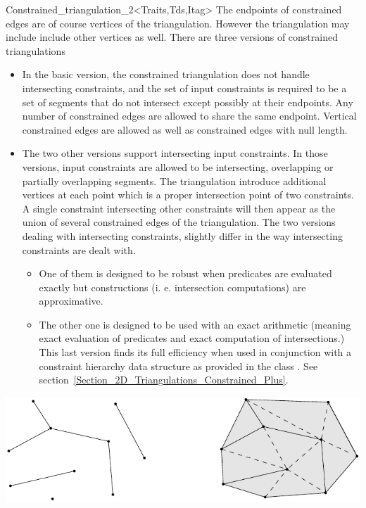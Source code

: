 \begin{ccRefClass}{Constrained_triangulation_2<Traits,Tds,Itag>}
The endpoints of constrained edges are of course vertices of the
triangulation. However the triangulation may include
include other vertices as well.
There are three versions of  constrained triangulations
\begin{itemize}
\item
In the basic version, the constrained triangulation 
does not handle intersecting constraints, and the set of input 
constraints is required to be a set of segments that do not intersect
except possibly at their endpoints. Any number of constrained edges
are allowed to share the same endpoint.  Vertical constrained edges
are allowed as well as 
constrained edges with null length.
\item
The two other versions support intersecting input constraints.
In those versions, input constraints are allowed to be
intersecting, overlapping or partially
overlapping segments.
The triangulation introduce  additional  vertices at each point which
is a proper intersection point of  two 
constraints. A single constraint intersecting other
constraints will then appear as the union of several 
constrained edges of  the triangulation.
The two versions dealing with intersecting constraints, slightly differ
in the way intersecting constraints are dealt with.
\begin{itemize}
\item  One of them is
designed to be robust when predicates are evaluated exactly but
constructions (i. e.  intersection computations) are
approximative.
\item
The other one is designed to be used 
with an exact arithmetic (meaning exact
evaluation of predicates and exact computation of intersections.)
This last version finds its full efficiency  when used in conjunction
with a constraint hierarchy data structure 
as provided in the class
. See
section~\ref{Section_2D_Triangulations_Constrained_Plus}.
\end{itemize}
\end{itemize}



\begin{ccTexOnly}
\begin{center} \includegraphics[scale=0.5]{Triangulation_2/constraints} \end{center}
\end{ccTexOnly}


\end{ccRefClass}
